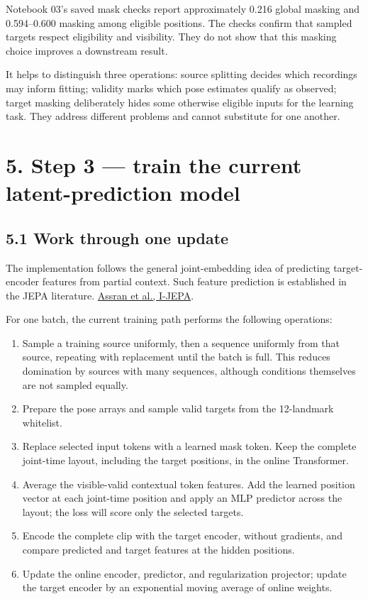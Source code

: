 \documentclass[11pt,letterpaper]{article}
\providecommand{\tightlist}{\setlength{\itemsep}{0pt}\setlength{\parskip}{0pt}}
\begin{document}
Notebook 03's saved mask checks report approximately 0.216 global
masking and 0.594--0.600 masking among eligible positions. The checks
confirm that sampled targets respect eligibility and visibility. They do
not show that this masking choice improves a downstream result.

It helps to distinguish three operations: source splitting decides which
recordings may inform fitting; validity marks which pose estimates
qualify as observed; target masking deliberately hides some otherwise
eligible inputs for the learning task. They address different problems
and cannot substitute for one another.

\section{5. Step 3 --- train the current latent-prediction
model}\label{step-3-train-the-current-latent-prediction-model}

\subsection{5.1 Work through one update}\label{work-through-one-update}

The implementation follows the general joint-embedding idea of
predicting target-encoder features from partial context. Such feature
prediction is established in the JEPA literature.
\href{https://arxiv.org/abs/2301.08243}{Assran et al., I-JEPA}.

For one batch, the current training path performs the following
operations:

\begin{enumerate}
\def\labelenumi{\arabic{enumi}.}
\tightlist
\item
  Sample a training source uniformly, then a sequence uniformly from
  that source, repeating with replacement until the batch is full. This
  reduces domination by sources with many sequences, although conditions
  themselves are not sampled equally.
\item
  Prepare the pose arrays and sample valid targets from the 12-landmark
  whitelist.
\item
  Replace selected input tokens with a learned mask token. Keep the
  complete joint-time layout, including the target positions, in the
  online Transformer.
\item
  Average the visible-valid contextual token features. Add the learned
  position vector at each joint-time position and apply an MLP predictor
  across the layout; the loss will score only the selected targets.
\item
  Encode the complete clip with the target encoder, without gradients,
  and compare predicted and target features at the hidden positions.
\item
  Update the online encoder, predictor, and regularization projector;
  update the target encoder by an exponential moving average of online
  weights.
\end{enumerate}
\end{document}
